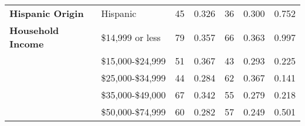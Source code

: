 \begin{tabular}{L{3cm} L{5cm} C{1.5cm} C{2.5cm} C{1.5cm} C{2.5cm} C{3cm}}
\textbf{Hispanic Origin}                                  &                         Hispanic                         &                            45                            &                          0.326                           &                            36                            &                          0.300                           &                          0.752                            \\
\textbf{Household Income}                                 &                     \$14,999 or less                     &                            79                            &                          0.357                           &                            66                            &                          0.363                           &                          0.997                            \\
                                                          &                    \$15,000-\$24,999                     &                            51                            &                          0.367                           &                            43                            &                          0.293                           &                          0.225                            \\
                                                          &                    \$25,000-\$34,999                     &                            44                            &                          0.284                           &                            62                            &                          0.367                           &                          0.141                            \\
                                                          &                    \$35,000-\$49,000                     &                            67                            &                          0.342                           &                            55                            &                          0.279                           &                          0.218                            \\
                                                          &                    \$50,000-\$74,999                     &                            60                            &                          0.282                           &                            57                            &                          0.249                           &                          0.501                            \\

\end{tabular}
